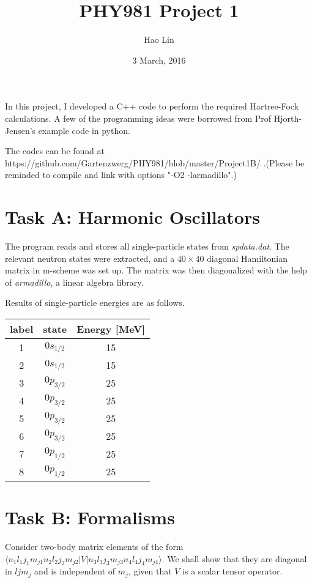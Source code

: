 \documentclass[11pt, oneside]{article}   	%
\title{PHY981 Project 1}
\author{Hao Lin}
\date{3 March, 2016}							%
\begin{document}
\maketitle

In this project, I developed a C++ code to perform the required Hartree-Fock calculations. A few of the programming ideas were borrowed from Prof Hjorth-Jensen's example code in python. 

The codes can be found at https://github.com/Gartenzwerg/PHY981/blob/master/Project1B/ .(Please be reminded to compile and link with options "-O2 -larmadillo".)

\section{Task A: Harmonic Oscillators}
The program reads and stores all single-particle states from \textit{spdata.dat}. The relevant neutron states were extracted, and a $40\times40$ diagonal Hamiltonian matrix in m-scheme was set up. The matrix was then diagonalized with the help of \textit{armadillo}, a linear algebra library. 

Results of single-particle energies are as follows.
\begin{table}[H]
  \centering
\begin{tabular}{ccc}
  \toprule
	label & state &Energy [MeV] \\
  \midrule
	1 & $0s_{1/2}$ & 15 \\
	2 & $0s_{1/2}$ & 15 \\
	3 & $0p_{3/2}$ & 25 \\
	4 & $0p_{3/2}$ & 25 \\
	5 & $0p_{3/2}$ & 25 \\
	6 & $0p_{3/2}$ & 25 \\
	7 & $0p_{1/2}$ & 25 \\
	8 & $0p_{1/2}$ & 25 \\
    \bottomrule
  \end{tabular}
\end{table}

\section{Task B: Formalisms}
Consider two-body matrix elements of the form $\langle n_1 l_1 j_1 m_{j1} n_2 l_2 j_2 m_{j2}|V|n_3 l_3 j_3 m_{j3} n_4 l_4 j_4 m_{j4}\rangle$. We shall show that they are diagonal in $ljm_j$ and is independent of $m_j$, given that $V$ is a scalar tensor operator.
\end{document}
